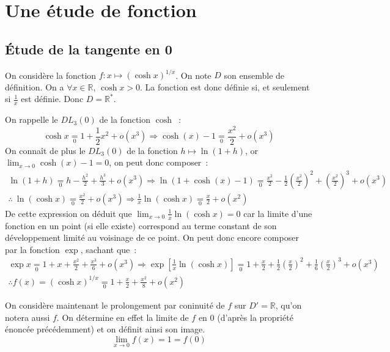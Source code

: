 \documentclass{article}
\newcommand{\oo}[1]{+ o\!\left(#1\right)}
\begin{document}
    \section{Une étude de fonction}
    \subsection{Étude de la tangente en 0}

    On considère la fonction $f\colon x \mapsto\left(\cosh x\right)^{1/x}$. On note $D$ son ensemble de définition. On a $\forall x\in\mathbb{R},\, \cosh x > 0$. La fonction est donc définie si, et seulement si $\frac{1}{x}$ est définie. Donc $D = \mathbb{R}^*$.

    On rappelle le $DL_3(0)$ de la fonction $\cosh$~:
    \begin{displaymath}
      \cosh x \underset{0}{=} 1 + \frac{1}{2}x^2 \oo{x^3} \Rightarrow \cosh(x) - 1 \underset{0}{=} \frac{x^2}{2} \oo{x^3}
    \end{displaymath}
    On connaît de plus le $DL_3(0)$ de la fonction $h\mapsto\ln(1+h)$, or $\lim_{x\to 0} \cosh(x) - 1 = 0$, on peut donc composer~:
    \begin{align*}
      \ln(1+h) \underset{0}{=} h - \frac{h^2}{2} + \frac{h^3}{3} \oo{x^3} \Rightarrow \ln(1 + \cosh(x) - 1) \underset{0}{=} \frac{x^2}{2} - \frac{1}{2}\left(\frac{x^2}{2}\right)^2 + \left(\frac{x^2}{2}\right)^3 \oo{x^3} \\
      \therefore\ \ln(\cosh x) \underset{0}{=} \frac{x^2}{2} \oo{x^3} \Rightarrow \frac{1}{x}\ln(\cosh x) \underset{0}{=} \frac{x}{2} \oo{x^2}
    \end{align*}
    De cette expression on déduit que $\lim_{x\to 0} \frac{1}{x}\ln(\cosh x) = 0$ car la limite d'une fonction en un point (si elle existe) correspond au terme constant de son développement limité au voisinage de ce point. On peut donc encore composer par la fonction $\exp$, sachant que~:
    \begin{align*}
      \exp x \underset{0}{=} 1 + x + \frac{x^2}{2} + \frac{x^3}{6} \oo{x^3}
      \Rightarrow \exp\left[\frac{1}{x}\ln(\cosh x)\right] \underset{0}{=} 1 + \frac{x}{2} + \frac{1}{2}\left(\frac{x}{2}\right)^2 + \frac{1}{6}\left(\frac{x}{2}\right)^3 \oo{x^3} \\
      \therefore f(x) = \left(\cosh x\right)^{1/x} \underset{0}{=} 1 + \frac{x}{2} + \frac{x^2}{8} \oo{x^2}
    \end{align*}

    On considère maintenant le prolongement par coninuité de $f$ sur $D' = \mathbb{R}$, qu'on notera aussi $f$. On détermine en effet la limite de $f$ en 0 (d'après la propriété énoncée précédemment) et on définit ainsi son image.
    \begin{displaymath}
      \lim_{x\to 0} f(x) = 1 = f(0)
    \end{displaymath}
\end{document}

